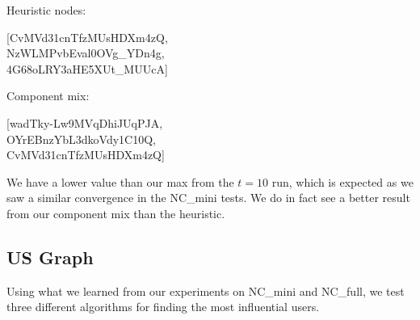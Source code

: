 \documentclass{article}
\begin{document}
		Heuristic nodes: 
		\begin{center}
		[CvMVd31cnTfzMUsHDXm4zQ, \\
		NzWLMPvbEval0OVg\_YDn4g,\\
		4G68oLRY3aHE5XUt\_MUUcA]\\
		\end{center}

		Component mix: 
		\begin{center}
		[wadTky-Lw9MVqDhiJUqPJA,\\
		OYrEBnzYbL3dkoVdy1C10Q,\\
		CvMVd31cnTfzMUsHDXm4zQ]\\
 		\end{center}

		We have a lower value than our max from the $t=10$ run, which is expected as we saw a similar convergence in the NC\_mini tests. We do in fact see a better result from our component mix than the heuristic.

	\subsection{US Graph}

		Using what we learned from our experiments on NC\_mini and NC\_full, we test three different algorithms for finding the most influential users.
\end{document}
